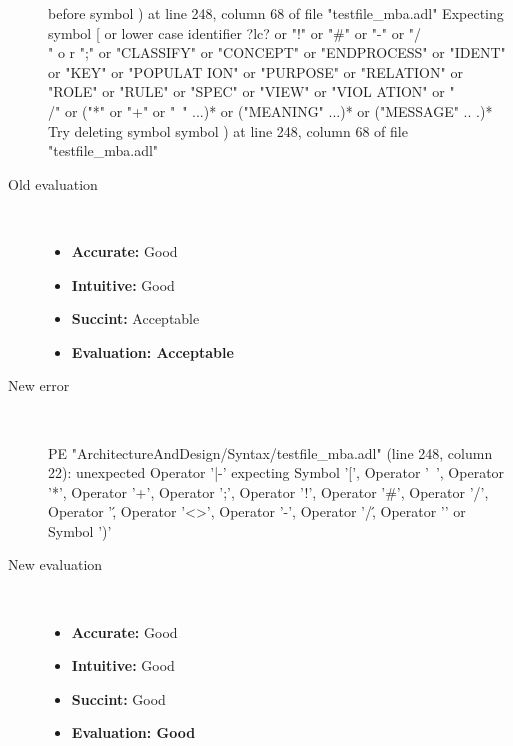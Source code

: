\begin{description}
\begin{haskell}
before symbol ) at line 248, column 68 of file "testfile_mba.adl"
Expecting symbol [ or lower case identifier ?lc? or "!" or "#" or "-" or "/\\" o
r ";" or "CLASSIFY" or "CONCEPT" or "ENDPROCESS" or "IDENT" or "KEY" or "POPULAT
ION" or "PURPOSE" or "RELATION" or "ROLE" or "RULE" or "SPEC" or "VIEW" or "VIOL
ATION" or "\\/" or ("*" or "+" or "~" ...)* or ("MEANING" ...)* or ("MESSAGE" ..
.)*
Try deleting symbol symbol ) at line 248, column 68 of file "testfile_mba.adl"
\end{haskell}
  \item[Old evaluation]~\\
    \begin{itemize}
    \item \textbf{Accurate:} Good
    \item \textbf{Intuitive:} Good
    \item \textbf{Succint:} Acceptable
    \item \textbf{Evaluation: Acceptable}
    \end{itemize}
  \item[New error]~\\
\begin{haskell}
PE "ArchitectureAndDesign/Syntax/testfile_mba.adl" (line 248, column 22):
unexpected Operator '|-'
expecting Symbol '[', Operator '~', Operator '*', Operator '+', Operator ';', Operator '!', Operator '#', Operator '/', Operator '\', Operator '<>', Operator '-', Operator '/\', Operator '\/' or Symbol ')'\end{haskell}
  \item[New evaluation]~\\
    \begin{itemize}
    \item \textbf{Accurate:} Good
    \item \textbf{Intuitive:} Good
    \item \textbf{Succint:} Good
    \item \textbf{Evaluation: Good
}
    \end{itemize}
  \end{description}

\hrulefill

